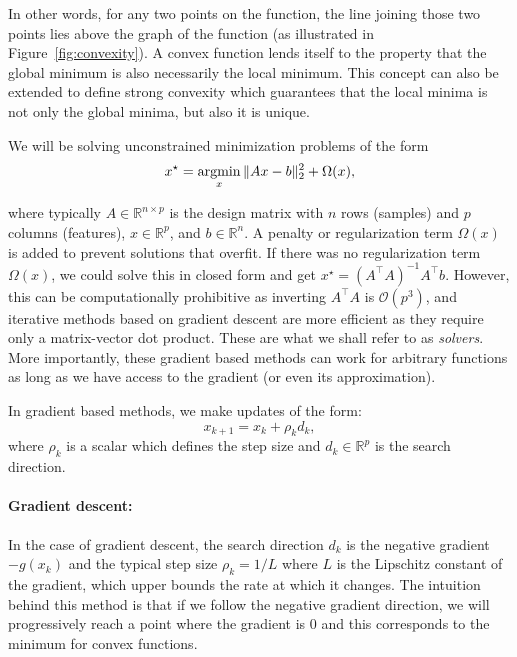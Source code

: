 In other words, for any two points on the function, the line joining those two points lies above the graph of the function (as illustrated in Figure~\ref{fig:convexity}). A convex function lends itself to the property that the global minimum is also necessarily the local minimum. This concept can also be extended to define strong convexity which guarantees that the local minima is not only the global minima, but also it is unique.

We will be solving unconstrained minimization problems of the form
\begin{equation}
x^{\star} = \mathop{\mathrm{argmin}}_x \|Ax - b\|_{2}^2 + \Omega(x),
\label{eq:linreg_minimize}
\end{equation}

%
where typically $A \in \mathbb{R}^{n \times p}$ is the design matrix with $n$ rows (samples) and $p$ columns (features), $x \in \mathbb{R}^p$, and $b \in \mathbb{R}^n$. A penalty or regularization term $\Omega(x)$ is added to prevent solutions that overfit. 
If there was no regularization term $\Omega(x)$, we could solve this in closed form and get $x^{\star} = {(A^{\top}A)}^{-1}A^{\top}b$. However, this can be computationally prohibitive as inverting $A^{\top}A$ is $\mathcal{O}(p^3)$, and iterative methods based on gradient descent are more efficient as they require only a matrix-vector dot product. These are what we shall refer to as \emph{solvers}. More importantly, these gradient based methods can work for arbitrary functions as long as we have access to the gradient (or even its approximation).

In gradient based methods, we make updates of the  form:
%
\begin{equation}
x_{k + 1} = x_{k} + \rho_k d_k,
\label{eq:update_term}
\end{equation}
%
where $\rho_k$ is a scalar which defines the step size and $d_k \in \mathbb{R}^p$ is the search direction.

\paragraph{Gradient descent: } In the case of gradient descent, the search direction $d_k$ is the negative gradient $-g(x_k)$ and the typical step size $\rho_k=1/L$ where $L$ is the Lipschitz constant of the gradient, which upper bounds the rate at which it changes. The intuition behind this method is that if we follow the negative gradient direction, we will progressively reach a point where the gradient is 0 and this corresponds to the minimum for convex functions.

